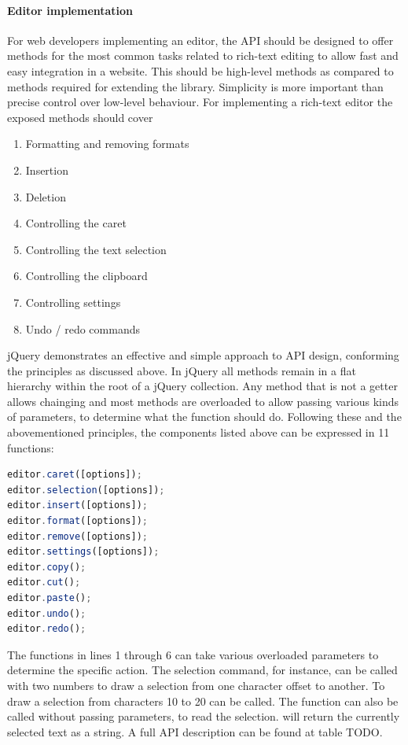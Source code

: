 \paragraph{Editor implementation}

For web developers implementing an editor, the API should be designed to offer methods for the most common tasks related to rich-text editing to allow fast and easy integration in a website. This should be high-level methods as compared to methods required for extending the library. Simplicity is more important than precise control over low-level behaviour. For implementing a rich-text editor the exposed methods should cover

\begin{enumerate}
\item Formatting and removing formats
\item Insertion
\item Deletion
\item Controlling the caret
\item Controlling the text selection
\item Controlling the clipboard
\item Controlling settings
\item Undo / redo commands
\end{enumerate}

\noindent jQuery demonstrates an effective and simple approach to API design, conforming the principles as discussed above. In jQuery all methods remain in a flat hierarchy within the root of a jQuery collection. Any method that is not a getter allows chainging and most methods are overloaded to allow passing various kinds of parameters, to determine what the function should do. Following these and the abovementioned principles, the components listed above can be expressed in 11 functions:

\begin{lstlisting}[language=JavaScript, caption=API for implementing a rich-text editor, label=lst:rich_text_api]
editor.caret([options]);
editor.selection([options]);
editor.insert([options]);
editor.format([options]);
editor.remove([options]);
editor.settings([options]);
editor.copy();
editor.cut();
editor.paste();
editor.undo();
editor.redo();
\end{lstlisting}

\noindent The functions in lines 1 through 6 can take various overloaded parameters to determine the specific action. The selection command, for instance, can be called with two numbers to draw a selection from one character offset to another. To draw a selection from characters 10 to 20  can be called. The function can also be called without passing parameters, to read the selection.  will return the currently selected text as a string. A full API description can be found at table TODO.

